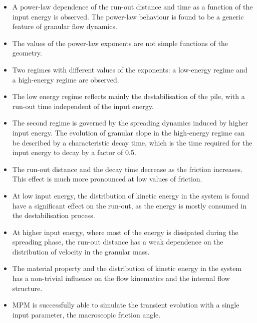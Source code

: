 \documentclass[3p,times,procedia,number]{elsarticle}
\begin{document}
\begin{itemize}

  \item A power-law dependence of the run-out distance and time as a 
    function of the input energy is observed. The power-law behaviour is found to 
    be a generic feature of granular flow dynamics. 

  \item The values of the power-law exponents are not simple functions of the 
    geometry. 

  \item Two regimes with different values of the exponents: 
    a low-energy regime and a high-energy regime are observed. 

  \item The low energy regime reflects mainly the destabilisation of the pile, 
    with a run-out time independent of the input energy.

  \item The second regime is governed by the spreading dynamics 
    induced by higher input energy. The evolution of granular slope in the 
    high-energy regime can be described by a characteristic decay time, which is 
    the time required for the input energy to decay by a factor of 0.5.

  \item The run-out distance and the decay time decrease as the friction 
    increases. This effect is much more pronounced at low values of friction.

  \item  At low input energy, the distribution of kinetic energy in the system is 
    found have a significant effect on the run-out, as the energy is mostly 
    consumed in the destabilisation process. 
     
  \item At higher input energy, where most of the energy is dissipated during 
    the spreading phase, the run-out distance has a weak dependence on the 
    distribution of velocity in the granular mass. 

  \item The material property and the distribution of kinetic energy in the 
    system has a non-trivial influence on the flow kinematics and the internal flow 
    structure.

  \item MPM is successfully able to simulate the transient evolution with a 
    single input parameter, the macroscopic friction angle.

\end{itemize}
\end{document}

